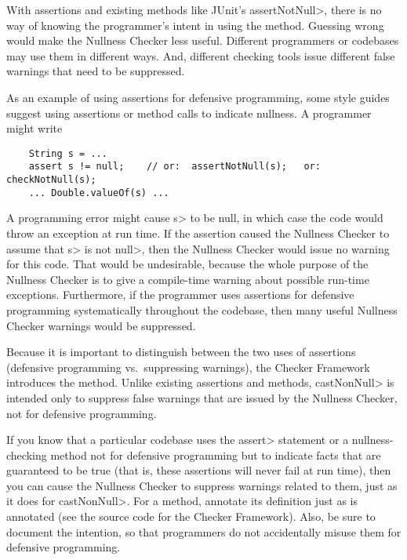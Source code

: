 With assertions and existing methods like JUnit's \<assertNotNull>, there
is no way of knowing the programmer's intent in using the method.  Guessing
wrong would make the Nullness Checker less useful.  Different programmers
or codebases may use them in different ways.  And, different checking tools
issue different false warnings that need to be suppressed.

As an example of using assertions for defensive programming, some style
guides suggest using assertions or method calls to indicate nullness.  A
programmer might write

\begin{Verbatim}
    String s = ...
    assert s != null;    // or:  assertNotNull(s);   or: checkNotNull(s);
    ... Double.valueOf(s) ...
\end{Verbatim}

A programming error might cause \<s> to be null, in which case the code
would throw an exception at run time.
If the assertion caused the Nullness Checker to assume that \<s> is not
\<null>, then the Nullness Checker would issue no warning for this code.
That would be undesirable, because the whole purpose of the Nullness
Checker is to give a compile-time warning about possible run-time
exceptions.  Furthermore, if the programmer uses assertions for defensive
programming systematically throughout the codebase, then many useful
Nullness Checker warnings would be suppressed.


Because it is important to distinguish between the two uses of assertions
(defensive programming vs.~suppressing warnings), the Checker Framework
introduces the  method.
Unlike existing assertions and
methods, \<castNonNull> is intended only to suppress false warnings that are
issued by the Nullness Checker, not for defensive programming.

If you know that a particular codebase uses the \<assert> statement or a
nullness-checking method not for defensive programming but to indicate
facts that are guaranteed to be true (that is, these assertions will never
fail at run time), then you can cause the Nullness Checker to suppress
warnings related to them, just as it does for \<castNonNull>.  For a
method, annotate its definition just as
 is annotated (see the
source code for the Checker Framework).
Also, be sure to document the intention, so that programmers do not
accidentally misuse them for defensive programming.


